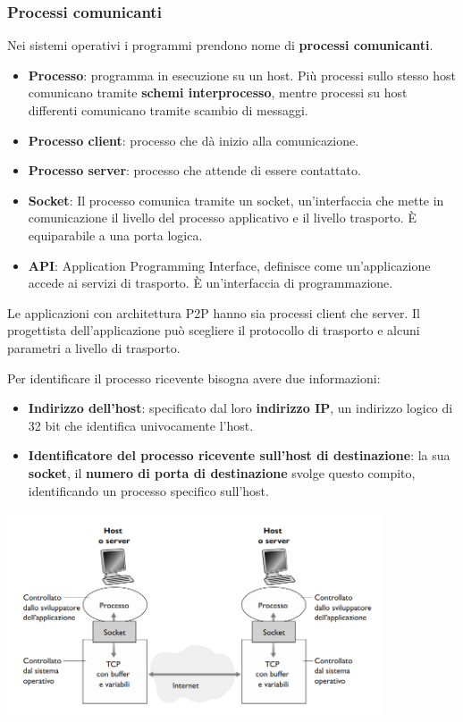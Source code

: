 \subsubsection{Processi comunicanti}
Nei sistemi operativi i programmi prendono nome di \textbf{processi comunicanti}.
\begin{itemize}
    \item \textbf{Processo}: programma in esecuzione su un host. Più processi sullo stesso host comunicano tramite \textbf{schemi interprocesso}, mentre processi su host differenti comunicano tramite scambio di messaggi.
    \item \textbf{Processo client}: processo che dà inizio alla comunicazione.
    \item \textbf{Processo server}: processo che attende di essere contattato.
    \item \textbf{Socket}: Il processo comunica tramite un socket, un'interfaccia che mette in comunicazione il livello del processo applicativo e il livello trasporto. È equiparabile a una porta logica.
    \item \textbf{API}: Application Programming Interface, definisce come un'applicazione accede ai servizi di trasporto. È un'interfaccia di programmazione.
\end{itemize}

Le applicazioni con architettura P2P hanno sia processi client che server. Il progettista dell'applicazione può scegliere il protocollo di trasporto e alcuni parametri a livello di trasporto.

Per identificare il processo ricevente bisogna avere due informazioni:
\begin{itemize}
  \item \textbf{Indirizzo dell'host}: specificato dal loro \textbf{indirizzo IP}, un indirizzo logico di 32 bit che identifica univocamente l'host.
  \item \textbf{Identificatore del processo ricevente sull'host di destinazione}: la sua \textbf{socket}, il \textbf{numero di porta di destinazione} svolge questo compito, identificando un processo specifico sull'host.
\end{itemize}

\includegraphics[width=\textwidth, height=6cm, keepaspectratio]{img/processi-socket.png}

